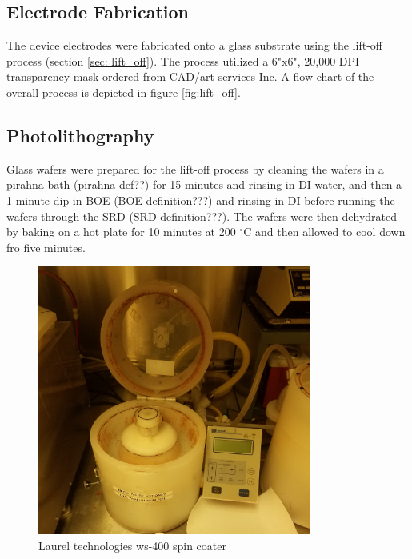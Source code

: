 \subsection{Electrode Fabrication}

\par The device electrodes were fabricated onto a glass substrate using the lift-off process (section \ref{sec: lift_off}). The process utilized a 6"x6", 20,000 DPI transparency mask ordered from CAD/art services Inc. A flow chart of the overall process is depicted in figure \ref{fig:lift_off}.

\subsection*{Photolithography}

\par Glass wafers were prepared for the lift-off process by cleaning the wafers in a pirahna bath (pirahna def??) for 15 minutes and rinsing in DI water, and then a 1 minute dip in BOE (BOE definition???) and rinsing in DI before running the wafers through the SRD (SRD definition???). The wafers were then dehydrated by baking on a hot plate for 10 minutes at 200 $^\circ$C and then allowed to cool down fro five minutes. 

\begin{figure}[h]
    \centering
    \includegraphics[width=0.8\textwidth]{images/resist_spinner_open.jpg}
    \caption{Laurel technologies ws-400 spin coater}
    \label{fig:spin_coater}
\end{figure}

